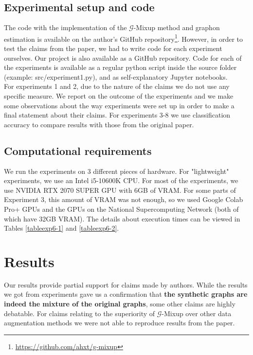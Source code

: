 \subsection{Experimental setup and code}
The code with the implementation of the $\mathcal{G}$-Mixup method and graphon estimation is available on the author's GitHub repository\footnote{\href{https://github.com/ahxt/g-mixup}{https://github.com/ahxt/g-mixup}}. However, in order to test the claims from the paper, we had to write code for each experiment ourselves. Our project is also available as a GitHub repository. Code for each of the experiments is available as a regular python script inside the source folder (example: src/experiment1.py), and as self-explanatory Jupyter notebooks. \\
For experiments 1 and 2, due to the nature of the claims we do not use any specific measure. We report on the outcome of the experiments and we make some observations about the way experiments were set up in order to make a final statement about their claims. For experiments 3-8 we use classification accuracy to compare results with those from the original paper.

\subsection{Computational requirements}
We run the experiments on 3 different pieces of hardware. For "lightweight" experiments, we use an Intel i5-10600K CPU. For most of the experiments, we use NVIDIA RTX 2070 SUPER GPU with 6GB of VRAM. For some parts of Experiment 3, this amount of VRAM was not enough, so we used Google Colab Pro+ GPUs and the GPUs on the National Supercomputing Network (both of which have 32GB VRAM). The details about execution times can be viewed in Tables \ref{tableexp6-1} and \ref{tableexp6-2}.


\section{Results}
\label{sec:results}
Our results provide partial support for claims made by authors. While the results we got from experiments gave us a confirmation that \textbf{the synthetic graphs are indeed the mixture of the original graphs}, some other claims are highly debatable. For claims relating to the superiority of $\mathcal{G}$-Mixup over other data augmentation methods we were not able to reproduce results from the paper.


